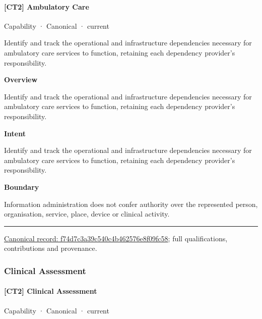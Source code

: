\paragraph{[CT2] Ambulatory Care}

\label{element:f74d7c3a39c540c4b462576e8f09fc58}
{\small Capability · Canonical · current}\par

Identify and track the operational and infrastructure dependencies necessary for ambulatory care services to function, retaining each dependency provider's responsibility.



\textbf{Overview}



Identify and track the operational and infrastructure dependencies necessary for ambulatory care services to function, retaining each dependency provider's responsibility.



\textbf{Intent}



Identify and track the operational and infrastructure dependencies necessary for ambulatory care services to function, retaining each dependency provider's responsibility.



\textbf{Boundary}



Information administration does not confer authority over the represented person, organisation, service, place, device or clinical activity.



\medskip\hrule\medskip

{\footnotesize \href{../../../../continuum/strategy/capability/f74d7c3a39c540c4b462576e8f09fc58.md}{Canonical record: f74d7c3a39c540c4b462576e8f09fc58}; full qualifications, contributions and provenance.}\par
\subsubsection{Clinical Assessment}

\paragraph{[CT2] Clinical Assessment}

\label{element:a7d84c95e48c453797419813ca80a66c}
{\small Capability · Canonical · current}\par

